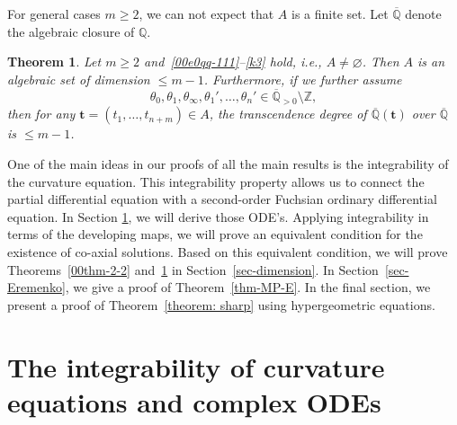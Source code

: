 \documentclass[pdftex]{sigma}
\numberwithin{equation}{section}
\newtheorem{Theorem}{Theorem}[section]
\def\Q{\mathbb Q}
\begin{document}
For general cases $m\geq 2$, we can not expect that $A$ is a finite
set. Let $\overline{\mathbb Q}$ denote the algebraic closure of $\mathbb{Q}$.

\begin{Theorem}\label{00thm-2-1}
Let $m\geq 2$ and~\eqref{00e0qq-111}--\eqref{k3} hold,
i.e., $A\neq\varnothing$. Then $A$ is an algebraic set of dimension $\leq
m-1$. Furthermore, if we further assume
\begin{equation} \label{000eq: theta alpha a}
 \theta_0,\theta_1,\theta_\infty,\theta_1',\dots,\theta_n'
 \in \overline{\Q}_{>0}\setminus\mathbb{Z},
\end{equation}
then for any $\boldsymbol t=(t_1,\dots,t_{n+m})\in A$, the transcendence degree of
 $\overline{\Q}(\boldsymbol t)$ over $\overline{\Q}$ is $\le m-1$.
\end{Theorem}

One of the main ideas in our proofs of all the main results is the
integrability of the curvature equation. This integrability property
allows us to connect the partial differential equation with a
second-order Fuchsian ordinary differential equation. In Section
\ref{sec-MP-E}, we will derive those ODE's. Applying integrability in
terms of the developing maps, we will prove an equivalent condition
for the existence of co-axial solutions. Based on this equivalent
condition, we will prove Theorems~\ref{00thm-2-2} and~\ref{00thm-2-1}
in Section~\ref{sec-dimension}. In Section~\ref{sec-Eremenko}, we give
a proof of Theorem~\ref{thm-MP-E}. In the final section, we present a
proof of Theorem~\ref{theorem: sharp} using hypergeometric equations.

\section{The integrability of curvature equations and complex ODEs}

\label{sec-MP-E}
\end{document}
